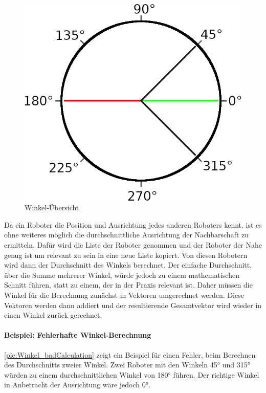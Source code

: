 \begin{figure}
	\includegraphics[width=\pictureWidth,keepaspectratio]{graphics/Winkel_badCalculation.png}
	\caption{Winkel-Übersicht}
	\label{pic:Winkel_badCalculation}
\end{figure}

Da ein Roboter die Position und Ausrichtung jedes anderen Roboters kennt, ist es ohne weiteres möglich die durchschnittliche Ausrichtung der Nachbarschaft zu ermitteln. Dafür wird die Liste der Roboter genommen und der Roboter der Nahe genug ist um relevant zu sein in eine neue Liste kopiert. Von diesen Robotern wird dann der Durchschnitt des Winkels berechnet. Der einfache Durchschnitt, über die Summe mehrerer Winkel, würde jedoch zu einem mathematischen Schnitt führen, statt zu einem, der in der Praxis relevant ist. Daher müssen die Winkel für die Berechnung zunächst in Vektoren umgerechnet werden. Diese Vektoren werden dann addiert und der resultierende Gesamtvektor wird wieder in einen Winkel zurück gerechnet.

\paragraph*{Beispiel: Fehlerhafte Winkel-Berechnung}
\autoref{pic:Winkel_badCalculation} zeigt ein Beispiel für einen Fehler, beim Berechnen des Durchschnitts zweier Winkel. Zwei Roboter mit den Winkeln 45° und 315° würden zu einem durchschnittlichen Winkel von 180° führen. Der richtige Winkel in Anbetracht der Ausrichtung wäre jedoch 0°.\\
 
